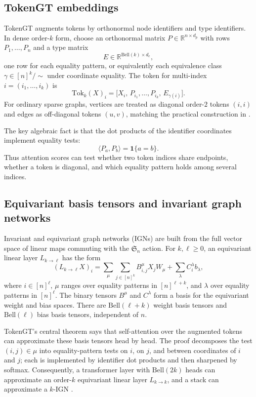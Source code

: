 \documentclass[11pt]{article}
\newcommand{\R}{\mathbb{R}}
\newcommand{\one}{\mathbf{1}}
\newcommand{\Sn}{\mathfrak{S}_n}
\newcommand{\bell}{\mathrm{Bell}}
\begin{document}
\subsection{TokenGT embeddings}

TokenGT \cite{kim2022tokengt} augments tokens by orthonormal node identifiers and type identifiers.  In dense order-$k$ form, choose an orthonormal matrix $P\in \R^{n\times d_p}$ with rows $P_1,\dots,P_n$ and a type matrix
\[
  E\in \R^{\bell(k)\times d_e},
\]
one row for each equality pattern, or equivalently each equivalence class $\gamma\in [n]^k/\!\sim$ under coordinate equality.  The token for multi-index $i=(i_1,\dots,i_k)$ is
\[
  \mathrm{Tok}_k(X)_i
  =
  \bigl[
    X_i,\,
    P_{i_1},\dots,P_{i_k},\,
    E_{\gamma(i)}
  \bigr].
\]
For ordinary sparse graphs, vertices are treated as diagonal order-$2$ tokens $(i,i)$ and edges as off-diagonal tokens $(u,v)$, matching the practical construction in \cite{kim2022tokengt}.

The key algebraic fact is that the dot products of the identifier coordinates implement equality tests:
\[
  \langle P_a,P_b\rangle = \one\{a=b\}.
\]
Thus attention scores can test whether two token indices share endpoints, whether a token is diagonal, and which equality pattern holds among several indices.

\subsection{Equivariant basis tensors and invariant graph networks}

Invariant and equivariant graph networks (IGNs) \cite{maron2019invariant,maron2019provably,maron2019universality} are built from the full vector space of linear maps commuting with the $\Sn$ action.  For $k,\ell\ge 0$, an equivariant linear layer $L_{k\to \ell}$ has the form
\begin{equation}
  (L_{k\to \ell}X)_i
  =
  \sum_{\mu}\sum_{j\in [n]^k} B^\mu_{i,j}X_jW_\mu
  +
  \sum_\lambda C^\lambda_i b_\lambda ,
  \label{eq:equivlayer}
\end{equation}
where $i\in [n]^\ell$, $\mu$ ranges over equality patterns in $[n]^{\ell+k}$, and $\lambda$ over equality patterns in $[n]^\ell$.  The binary tensors $B^\mu$ and $C^\lambda$ form a basis for the equivariant weight and bias spaces.  There are $\bell(\ell+k)$ weight basis tensors and $\bell(\ell)$ bias basis tensors, independent of $n$.

TokenGT's central theorem says that self-attention over the augmented tokens can approximate these basis tensors head by head.  The proof decomposes the test $(i,j)\in\mu$ into equality-pattern tests on $i$, on $j$, and between coordinates of $i$ and $j$; each is implemented by identifier dot products and then sharpened by softmax.  Consequently, a transformer layer with $\bell(2k)$ heads can approximate an order-$k$ equivariant linear layer $L_{k\to k}$, and a stack can approximate a $k$-IGN \cite{kim2022tokengt}.
\end{document}
